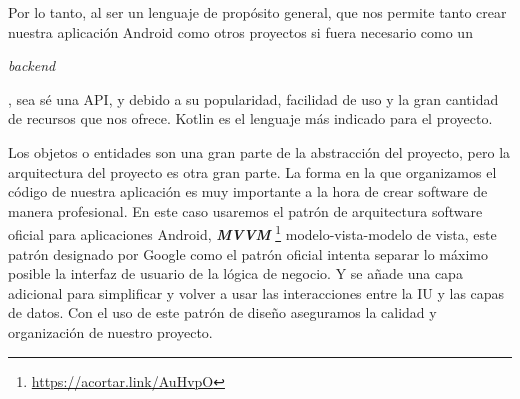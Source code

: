 Por lo tanto, al ser un lenguaje de propósito general, que nos permite tanto crear nuestra aplicación 
Android como otros proyectos si fuera necesario como un \begin{otherlanguage}{english}\textit{backend}\end{otherlanguage}, 
sea sé una API, y debido a su popularidad, facilidad de uso y la gran cantidad de recursos que nos ofrece. 
Kotlin es el lenguaje más indicado para el proyecto.

Los objetos o entidades son una gran parte de la abstracción del proyecto, pero la arquitectura del 
proyecto es otra gran parte. La forma en la que organizamos el código de nuestra aplicación es muy 
importante \cite{ArqSoft} a la hora de crear software de manera profesional. En este caso usaremos el 
patrón de arquitectura software oficial para aplicaciones Android, \textbf{\textit{MVVM}}  
\footnote{\url{https://acortar.link/AuHvpO}} modelo-vista-modelo de vista, este patrón designado por 
Google como el patrón oficial intenta separar lo máximo posible la interfaz de usuario de la lógica de 
negocio. Y se añade una capa adicional para simplificar y volver a usar las interacciones entre la IU y 
las capas de datos. Con el uso de este patrón de diseño aseguramos la calidad y organización de nuestro 
proyecto.

